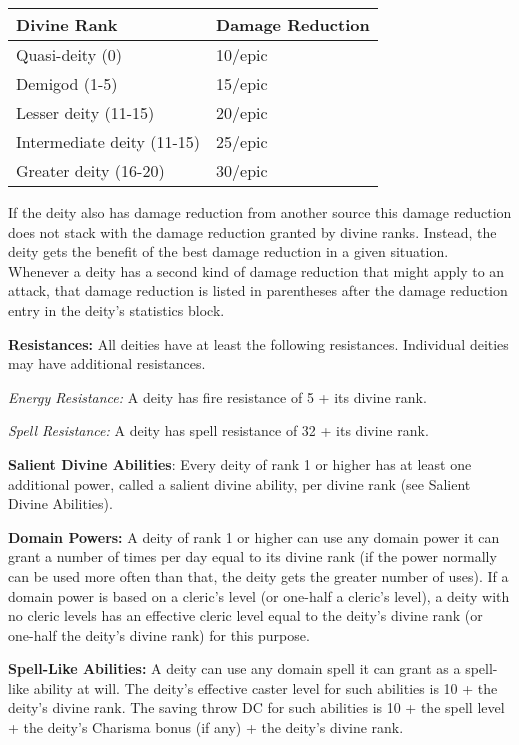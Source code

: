 \documentclass{article}
\begin{document}
\begin{tabular}{|>{\raggedright}p{104pt}|>{\raggedright}p{80pt}|}
\hline
D\textbf{ivine Rank} & D\textbf{amage Reduction}\tabularnewline
\hline
Quasi-deity (0) & 10/epic\tabularnewline
\hline
Demigod (1-5) & 15/epic\tabularnewline
\hline
Lesser deity (11-15) & 20/epic\tabularnewline
\hline
Intermediate deity (11-15) & 25/epic\tabularnewline
\hline
Greater deity (16-20) & 30/epic\tabularnewline
\hline
\end{tabular}

\vspace{12pt}
If the deity also has damage reduction from another source this damage reduction 
does not stack with the damage reduction granted by divine ranks. Instead, the 
deity gets the benefit of the best damage reduction in a given situation. Whenever 
a deity has a second kind of damage reduction that might apply to an attack, that 
damage reduction is listed in parentheses after the damage reduction entry in the 
deity's statistics block.

\vspace{12pt}
\textbf{Resistances:} All deities have at least the following resistances.  Individual 
deities may have additional resistances.

\textit{Energy Resistance: }A deity has fire resistance of 5 + its divine rank.

\textit{Spell Resistance: }A deity has spell resistance of 32 + its divine rank.

\vspace{12pt}
\textbf{Salient Divine Abilities}: Every deity of rank 1 or higher has at least 
one additional power, called a salient divine ability, per divine rank (see Salient 
Divine Abilities).

\vspace{12pt}
\textbf{Domain Powers:} A deity of rank 1 or higher can use any domain power it 
can grant a number of times per day equal to its divine rank (if the power normally 
can be used more often than that, the deity gets the greater number of uses). If 
a domain power is based on a cleric's level (or one-half a cleric's level), a deity 
with no cleric levels has an effective cleric level equal to the deity's divine 
rank (or one-half the deity's divine rank) for this purpose.

\vspace{12pt}
\textbf{Spell-Like Abilities:} A deity can use any domain spell it can grant as 
a spell-like ability at will. The deity's effective caster level for such abilities 
is 10 + the deity's divine rank. The saving throw DC for such abilities is 10 + 
the spell level + the deity's Charisma bonus (if any) + the deity's divine rank.
\end{document}
